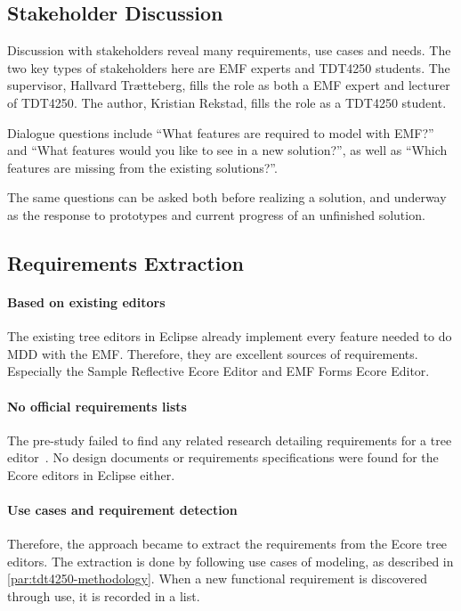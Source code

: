 \subsection{Stakeholder Discussion}\label{subsec:req-stakeholder}

Discussion with stakeholders reveal many requirements, use cases and needs.
The two key types of stakeholders here are \acrshort{EMF} experts and \gls{TDT4250} students.
The supervisor, Hallvard Trætteberg, fills the role as both a \acrshort{EMF} expert and lecturer of \gls{TDT4250}.
The author, Kristian Rekstad, fills the role as a \gls{TDT4250} student.


Dialogue questions include ``What features are required to model with \acrshort{EMF}?'' and ``What features would you like to see in a new solution?'', as well as ``Which features are missing from the existing solutions?''.


The same questions can be asked both before realizing a solution, and underway as the response to prototypes and current progress of an unfinished solution.


\subsection{Requirements Extraction}

\paragraph{Based on existing editors}
The existing tree editors in \gls{Eclipse} already implement every feature needed to do \acrlong{MDD} with the \acrlong{EMF}.
Therefore, they are excellent sources of requirements.
Especially the Sample Reflective Ecore Editor and EMF Forms Ecore Editor. %


\paragraph{No official requirements lists}
The pre-study failed to find any related research detailing requirements for a tree editor~\cite[p.~3]{rekstadModelingEnvironmentCloud2020}.
No design documents or requirements specifications were found for the \gls{Ecore} editors in \gls{Eclipse} either.


\paragraph{Use cases and requirement detection}
Therefore, the approach became to extract the requirements from the \gls{Ecore} tree editors.
The extraction is done by following use cases of modeling, as described in \cref{par:tdt4250-methodology}.
When a new functional requirement is discovered through use, it is recorded in a list.


